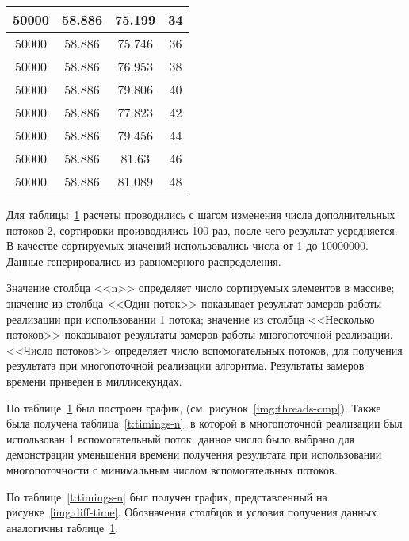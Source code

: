 \begin{table}[ht]
\begin{tabular}{|c|c|c|c|}
		50000 & 58.886                  & 75.199                            & 34          \\ \hline
		50000 & 58.886                  & 75.746                            & 36          \\ \hline
		50000 & 58.886                  & 76.953                            & 38          \\ \hline
		50000 & 58.886                  & 79.806                            & 40          \\ \hline
		50000 & 58.886                  & 77.823                            & 42          \\ \hline
		50000 & 58.886                  & 79.456                            & 44          \\ \hline
		50000 & 58.886                  & 81.63                             & 46          \\ \hline
		50000 & 58.886                  & 81.089                            & 48          \\ \hline
	\end{tabular}
	\label{t:timings}
\end{table}
Для таблицы~\ref{t:timings} расчеты проводились с шагом изменения числа дополнительных потоков 2, сортировки производились 100 раз, после чего результат усредняется. В качестве сортируемых значений использовались  числа от 1 до 10000000. Данные генерировались из равномерного распределения.

Значение столбца <<n>> определяет число сортируемых элементов в массиве; значение из столбца <<Один поток>> показывает результат замеров работы реализации при использовании 1 потока; значение  из столбца <<Несколько потоков>> показывают результаты замеров работы многопоточной реализации. <<Число потоков>> определяет число вспомогательных потоков, для получения результата при многопоточной реализации алгоритма. Результаты замеров времени приведен в миллисекундах.

По таблице~\ref{t:timings} был построен график, (см. рисунок~\ref{img:threads-cmp}).
Также была получена таблица~\ref{t:timings-n}, в которой в многопоточной реализации был использован 1 вспомогательный поток: данное число было выбрано для демонстрации уменьшения времени получения результата при использовании многопоточности с минимальным числом вспомогательных потоков.

По таблице~\ref{t:timings-n} был получен график, представленный на рисунке~\ref{img:diff-time}. 
Обозначения столбцов и условия получения данных аналогичны таблице~\ref{t:timings}.

